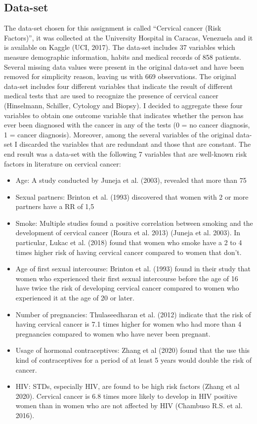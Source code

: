 \documentclass[10pt, fullpage, a4paper, titlepage]{article}
\begin{document}
\subsection{Data-set}
  The data-set chosen for this assignment is called “Cervical cancer (Risk Factors)”, it was collected at the University Hospital in Caracas, Venezuela and it is available on Kaggle (UCI, 2017). The data-set includes 37 variables which measure demographic information, habits and medical records of 858 patients. Several missing data values were present in the original data-set and have been removed for simplicity reason, leaving us with 669 observations. 
The original data-set includes four different variables that indicate the result of different medical tests that are used to recognize the presence of cervical cancer (Hinselmann, Schiller, Cytology and Biopsy). I decided to aggregate these four variables to obtain one outcome variable that indicates whether the person has ever been diagnosed with the cancer in any of the tests (0 = no cancer diagnosis, 1 = cancer diagnosis). Moreover, among the several variables of the original data-set I discarded the variables that are redundant and those that are constant. The end result was a data-set with the following 7 variables that are well-known risk factors in literature on cervical cancer:
\begin{itemize}
    \item 	Age: A study conducted by Juneja et al. (2003), revealed that more than 75%
\item 	Sexual partners: Brinton et al. (1993) discovered that women with 2 or more partners have a RR of 1,5%
\item 	Smoke: Multiple studies found a positive correlation between smoking and the development of cervical cancer (Roura et al. 2013) (Juneja et al. 2003). In particular, Lukac et al. (2018) found that women who smoke have a 2 to 4 times higher risk of having cervical cancer compared to women that don’t. 
\item 	Age of first sexual intercourse: Brinton et al. (1993) found in their study that women who experienced their first sexual intercourse before the age of 16 have twice the risk of developing cervical cancer compared to women who experienced it at the age of 20 or later.
\item 	Number of pregnancies: Thulaseedharan et al. (2012) indicate that the risk of having cervical cancer is 7.1 times higher for women who had more than 4 pregnancies compared to women who have never been pregnant.
\item 	Usage of hormonal contraceptives: Zhang et al (2020) found that the use this kind of contraceptives for a period of at least 5 years would double the risk of cancer.
\item 	HIV: STDs, especially HIV, are found to be high risk factors (Zhang et al 2020). Cervical cancer is 6.8 times more likely to develop in HIV positive women than in women who are not affected by HIV (Chambuso R.S. et al. 2016).
\end{itemize}
\end{document}
